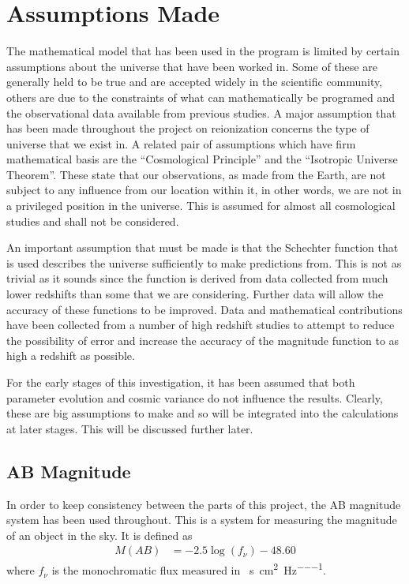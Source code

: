 
\section{Assumptions Made} %
\label{sec:assumptions_made}
	The mathematical model that has been used in the program is limited by certain assumptions about the universe that have been worked in. Some of these are generally held to be true and are accepted widely in the scientific community, others are due to the constraints of what can mathematically be programed and the observational data available from previous studies. A major assumption that has been made throughout the project on reionization concerns the type of universe that we exist in. A related pair of assumptions which have firm mathematical basis are the ``Cosmological Principle'' and the ``Isotropic Universe Theorem''. These state that our observations, as made from the Earth, are not subject to any influence from our location within it, in other words, we are not in a privileged position in the universe. This is assumed for almost all cosmological studies and shall not be considered.

	An important assumption that must be made is that the Schechter function that is used describes the universe sufficiently to make predictions from. This is not as trivial as it sounds since the function is derived from data collected from much lower redshifts than some that we are considering. Further data will allow the accuracy of these functions to be improved. Data and mathematical contributions have been collected from a number of high redshift studies to attempt to reduce the possibility of error and increase the accuracy of the magnitude function to as high a redshift as possible.

	For the early stages of this investigation, it has  been assumed that both parameter evolution and cosmic variance do not influence the results. Clearly, these are big assumptions to make and so will be integrated into the calculations at later stages. This will be discussed further later.

	\subsection{AB Magnitude} %
	\label{ssub:ab_magnitude}
		In order to keep consistency between the parts of this project, the AB magnitude system has been used throughout. This is a system for measuring the magnitude of an object in the sky. It is defined as
		\begin{align}
			M(AB) &= -2.5\log(f_\nu) -48.60 \label{eq:ab_magnitude}
		\end{align}
		where $f_\nu$ is the monochromatic flux measured in \si{\erg\per\second\per\square\centi\metre\per\hertz}.

